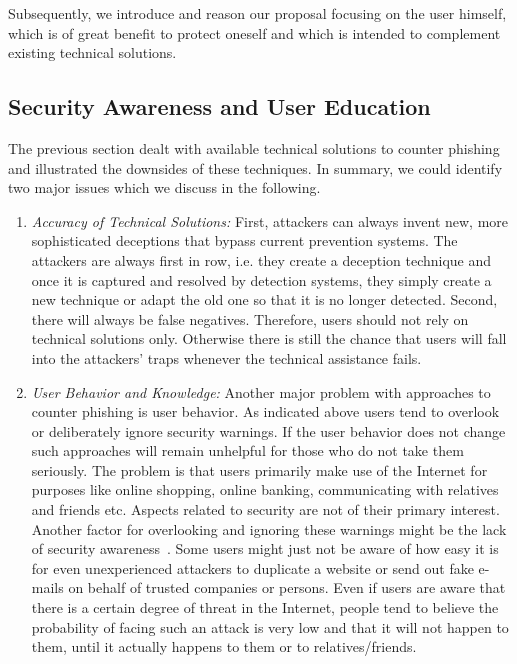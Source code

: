 Subsequently, we introduce and reason our proposal focusing on the user himself, which is of great benefit to protect oneself and which is intended to complement existing technical solutions.
 \subsection{Security Awareness and User Education}
 \label{s:awareness}

The previous section dealt with available technical solutions to counter phishing and illustrated the downsides of these techniques.
In summary, we could identify two major issues which we discuss in the following.
\begin{enumerate}
	\item\textit{Accuracy of Technical Solutions:} First, attackers can always invent new, more sophisticated deceptions that bypass current prevention systems.
	 The attackers are always first in row, i.e. they create a deception technique and once it is captured and resolved by detection systems, they simply create a new technique or adapt the old one so that it is no longer detected.
	 Second, there will always be false negatives.
Therefore, users should not rely on technical solutions only. 
Otherwise there is still the chance that users will fall into the attackers' traps whenever the technical assistance fails.
	\item\textit{User Behavior and Knowledge:} Another major problem with approaches to counter phishing is user behavior.
 As indicated above users tend to overlook or deliberately ignore security warnings.
 If the user behavior does not change such approaches will remain unhelpful for those who do not take them seriously.
 The problem is that users primarily make use of the Internet for purposes like online shopping, online banking, communicating with relatives and friends etc.
 Aspects related to security are not of their primary interest.
 Another factor for overlooking and ignoring these warnings might be the lack of security awareness~\cite{akhawe2013alice}.
 Some users might just not be aware of how easy it is for even unexperienced attackers to duplicate a website or send out fake e-mails on behalf of trusted companies or persons.
 Even if users are aware that there is a certain degree of threat in the Internet, people tend to believe the probability of facing such an attack is very low and that it will not happen to them, until it actually happens to them or to relatives/friends.
\end{enumerate}

